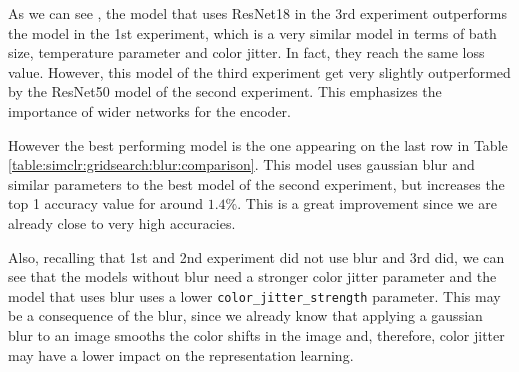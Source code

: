     \begin{table}[H]
        \caption{Comparison of the results of the third experiment with the best results of the two previous experiments.}
        \label{table:simclr:gridsearch:blur:comparison}
        \end{table}

As we can see , the model that uses ResNet18 in the 3rd experiment outperforms the model in the 1st experiment, which is a very similar model in terms of bath size, temperature parameter and color jitter. In fact, they reach the same loss value. However, this model of the third experiment get very slightly outperformed by the ResNet50 model of the second experiment. This emphasizes the importance of wider networks for the encoder. 

However the best performing model is the one appearing on the last row in Table \ref{table:simclr:gridsearch:blur:comparison}. This model uses gaussian blur and similar parameters to the best model of the second experiment, but increases the top 1 accuracy value for around $1.4\%$. This is a great improvement since we are already close to very high accuracies.  

Also, recalling that 1st and 2nd experiment did not use blur and 3rd did, we can see that the models without blur need a stronger color jitter parameter and the model that uses blur uses a lower \lstinline{color_jitter_strength} parameter. This may be a consequence of the blur, since we already know that applying a gaussian blur to an image smooths the color shifts in the image and, therefore, color jitter may have a lower impact on the representation learning.

